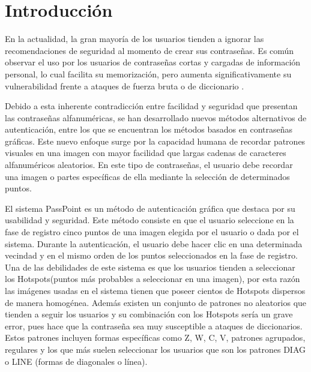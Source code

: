 \documentclass[12pt]{report}
\begin{document}
\tableofcontents
\newpage
\listoffigures
\newpage
\listoftables


\chapter*{\LARGE{Introducción}}
\hypertarget{introduccion}{}


	En la actualidad, la gran mayoría de los usuarios tienden a ignorar las recomendaciones de seguridad al momento de crear sus contraseñas. Es común observar el uso por los usuarios de contraseñas cortas y cargadas de información personal, lo cual facilita su memorización, pero aumenta significativamente su vulnerabilidad frente a ataques de fuerza bruta o de diccionario \cite{1,2,3,4}.
	
	Debido a esta inherente contradicción entre facilidad y seguridad que presentan las contraseñas alfanuméricas, se han desarrollado nuevos métodos alternativos de autenticación, entre los que se encuentran los métodos basados  en contraseñas gráficas. Este nuevo enfoque surge por la capacidad humana de recordar patrones visuales en una imagen con mayor facilidad que largas cadenas de caracteres alfanuméricos aleatorios. En este tipo de contraseñas, el usuario debe recordar una imagen o partes específicas de ella mediante la selección  de determinados puntos.
	
	El sistema PassPoint\cite{1} es un método de autenticación gráfica que destaca por su usabilidad y seguridad. Este método consiste  en que el usuario seleccione en la fase de registro  cinco puntos de una imagen elegida por el usuario o dada por el sistema. Durante la autenticación, el usuario debe hacer clic en una determinada vecindad y en el mismo orden de los puntos seleccionados en la fase de  registro. Una de las debilidades de este sistema es que los usuarios tienden a seleccionar los Hotspots\cite{4}(puntos más probables a seleccionar en una imagen), por esta razón las imágenes usadas en el sistema tienen que poseer cientos de Hotspots dispersos de manera homogénea. Además existen un conjunto de patrones no aleatorios que tienden a seguir los usuarios y su combinación con los Hotspots sería un grave error, pues hace que la contraseña sea muy susceptible a ataques de diccionarios. Estos patrones incluyen formas específicas como Z, W, C, V, patrones agrupados, regulares y los que más suelen seleccionar los usuarios  que son los  patrones DIAG o LINE (formas de diagonales o línea)\cite{5}.
	
\end{document}
